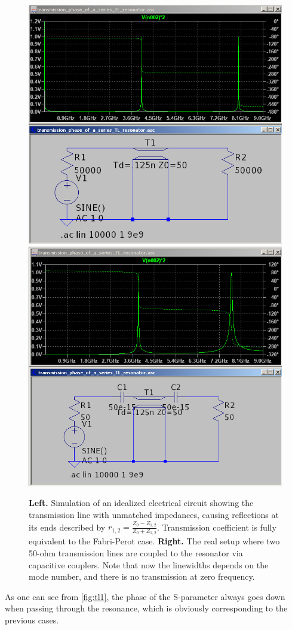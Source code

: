 \documentclass{article}
\begin{document}
	\begin{figure}[h!]
		\centering
		\includegraphics[width=0.45\linewidth]{Pictures/Plotting/TL1}
		\includegraphics[width=0.45\linewidth]{Pictures/Plotting/TL2}
		\caption{\textbf{Left.}  Simulation of an idealized electrical circuit showing the transmission line with unmatched impedances, causing reflections at its ends described by $r_{1,2} = \frac{Z_0 - Z_{1,2}}{Z_0 + Z_{1,2}}$. Transmission coefficient is fully equivalent to the Fabri-Perot case. \textbf{Right.} The real setup where two 50-ohm transmission lines are coupled to the resonator via capacitive couplers. Note that now the linewidths depends on the mode number, and there is no transmission at zero frequency.}
		\label{fig:tl1}
	\end{figure}
	
	As one can see from \autoref{fig:tl1}, the phase of the S-parameter always goes down when passing through the resonance, which is obviously corresponding to the previous cases.
	
	
\end{document}
